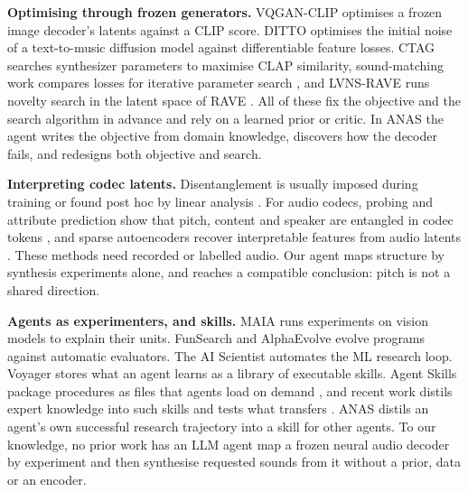 \documentclass[10pt,twocolumn]{article}
\renewcommand{\paragraph}[1]{\smallskip\noindent\textbf{#1}\;}
\begin{document}
\paragraph{Optimising through frozen generators.} VQGAN-CLIP \cite{crowson2022vqganclip} optimises a frozen image decoder's latents against a CLIP score. DITTO \cite{novack2024ditto} optimises the initial noise of a text-to-music diffusion model against differentiable feature losses. CTAG \cite{cherep2024ctag} searches synthesizer parameters to maximise CLAP similarity, sound-matching work compares losses for iterative parameter search \cite{salimi2025soundmatching}, and LVNS-RAVE \cite{guo2024lvnsrave} runs novelty search in the latent space of RAVE \cite{caillon2021rave}. All of these fix the objective and the search algorithm in advance and rely on a learned prior or critic. In ANAS the agent writes the objective from domain knowledge, discovers how the decoder fails, and redesigns both objective and search.

\paragraph{Interpreting codec latents.} Disentanglement is usually imposed during training \cite{higgins2017beta} or found post hoc by linear analysis \cite{harkonen2020ganspace}. For audio codecs, probing and attribute prediction show that pitch, content and speaker are entangled in codec tokens \cite{sadok2025interpretability}, and sparse autoencoders recover interpretable features from audio latents \cite{paek2025sae}. These methods need recorded or labelled audio. Our agent maps structure by synthesis experiments alone, and reaches a compatible conclusion: pitch is not a shared direction.

\paragraph{Agents as experimenters, and skills.} MAIA \cite{shaham2024maia} runs experiments on vision models to explain their units. FunSearch \cite{romera2024funsearch} and AlphaEvolve \cite{novikov2025alphaevolve} evolve programs against automatic evaluators. The AI Scientist \cite{lu2024aiscientist} automates the ML research loop. Voyager \cite{wang2023voyager} stores what an agent learns as a library of executable skills. Agent Skills package procedures as files that agents load on demand \cite{xu2026agentskills}, and recent work distils expert knowledge into such skills \cite{zhou2026colleague} and tests what transfers \cite{kassis2026mimeo}. ANAS distils an agent's own successful research trajectory into a skill for other agents. To our knowledge, no prior work has an LLM agent map a frozen neural audio decoder by experiment and then synthesise requested sounds from it without a prior, data or an encoder.
\end{document}
